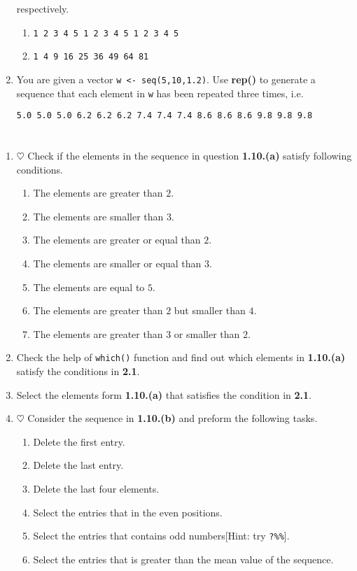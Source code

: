\documentclass[a4paper]{article}
\begin{document}
\begin{enumerate}
    respectively.
    \begin{enumerate}
    \item \texttt{1 2 3 4 5 1 2 3 4 5 1 2 3 4 5}
    \item \texttt{1  4  9 16 25 36 49 64 81}
    \end{enumerate}
  \item You are given a vector \texttt{w <- seq(5,10,1.2)}. Use \textbf{rep()}
    to generate a sequence that each element in \texttt{w} has been repeated
    three times, i.e.
\begin{verbatim}
5.0 5.0 5.0 6.2 6.2 6.2 7.4 7.4 7.4 8.6 8.6 8.6 9.8 9.8 9.8
\end{verbatim}
\end{enumerate}

\section{}
\begin{enumerate}
\item $\heartsuit$ Check if the elements in the sequence in question \textbf{1.10.(a)} satisfy following conditions.
  \begin{enumerate}
  \item The elements are greater than $2$.
  \item The elements are smaller than $3$.
  \item The elements are greater or equal than $2$.
  \item The elements are smaller or equal than $3$.
  \item The elements are equal to $5$.
  \item The elements are greater than $2$ but smaller than $4$.
  \item The elements are greater than $3$ or smaller than $2$.
  \end{enumerate}
\item Check the help of \texttt{which()} function and find out which elements in
  \textbf{1.10.(a)} satisfy the conditions in \textbf{2.1}.
\item  Select the elements form \textbf{1.10.(a)} that satisfies the
  condition in \textbf{2.1}.
\item $\heartsuit$ Consider the sequence in \textbf{1.10.(b)} and preform the following
  tasks.
  \begin{enumerate}
  \item Delete the first entry.
  \item Delete the last entry.
  \item Delete the last four elements.
  \item Select the entries that in the even positions.
  \item Select the entries that contains odd numbers[Hint: try
    \texttt{?\%\%}].
  \item Select the entries that is greater than the mean value of the
    sequence.
  \end{enumerate}
\end{enumerate}
\end{document}
